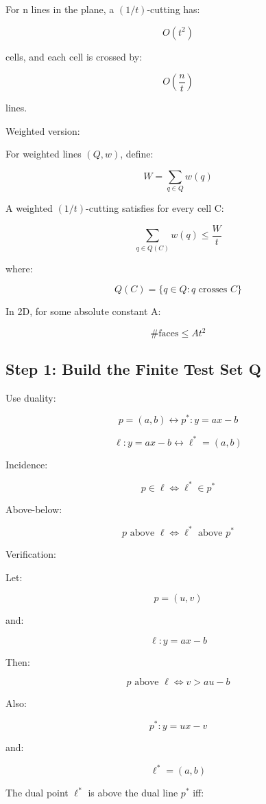 \documentclass[
  11pt,
]{article}
\begin{document}
For n lines in the plane, a \((1/t)\)-cutting has:

\[
O(t^2)
\]

cells, and each cell is crossed by:

\[
O\left(\frac nt\right)
\]

lines.

Weighted version:

For weighted lines \((Q,w)\), define:

\[
W=\sum_{q\in Q}w(q)
\]

A weighted \((1/t)\)-cutting satisfies for every cell C:

\[
\sum_{q\in Q(C)}w(q)\le \frac Wt
\]

where:

\[
Q(C)=\lbrace q\in Q:q\text{ crosses }C \rbrace
\]

In 2D, for some absolute constant A:

\[
\#\text{faces}\le At^2
\]

\hypertarget{step-1-build-the-finite-test-set-q}{%
\subsection{Step 1: Build the Finite Test Set
Q}\label{step-1-build-the-finite-test-set-q}}

Use duality:

\[
p=(a,b)\longleftrightarrow p^\ast :y=ax-b
\]

\[
\ell:y=ax-b\longleftrightarrow \ell^\ast =(a,b)
\]

Incidence:

\[
p\in\ell\Longleftrightarrow \ell^\ast \in p^\ast 
\]

Above-below:

\[
p\text{ above }\ell \Longleftrightarrow \ell^\ast \text{ above }p^\ast 
\]

Verification:

Let:

\[
p=(u,v)
\]

and:

\[
\ell:y=ax-b
\]

Then:

\[
p\text{ above }\ell \Longleftrightarrow v>au-b
\]

Also:

\[
p^\ast :y=ux-v
\]

and:

\[
\ell^\ast =(a,b)
\]

The dual point \(\ell^*\) is above the dual line \(p^*\) iff:
\end{document}
